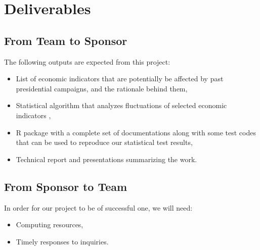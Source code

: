 \documentclass[12pt,letterpaper]{article}
\theoremstyle{definition}
\begin{document}
\section{Deliverables}
\subsection{From Team to Sponsor} %
The following outputs are expected from this project:
\begin{itemize}
    \item List of economic indicators that are potentially be affected by past presidential campaigns, and the rationale behind them,
    \item Statistical algorithm that analyzes fluctuations of selected economic indicators ,
    \item R package with a complete set of documentations along with some test codes that can be used to reproduce our statistical test results,
    \item Technical report and presentations summarizing the work. 
\end{itemize}

\subsection{From Sponsor to Team} %

In order for our project to be of successful one, we will need:
\begin{itemize}

    \item Computing resources,
    \item Timely responses to inquiries.

\end{itemize}


\newpage


\end{document}
